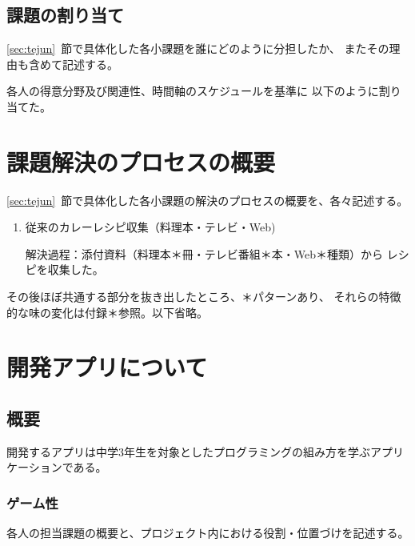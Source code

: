 \documentclass[openany,11pt,papersize]{jsbook}
\begin{document}

\section{課題の割り当て}
\begin{hissu}
\ref{sec:tejun}~節で具体化した各小課題を誰にどのように分担したか、
またその理由も含めて記述する。
\end{hissu}

各人の得意分野及び関連性、時間軸のスケジュールを基準に
以下のように割り当てた。


\chapter{課題解決のプロセスの概要}
\begin{hissu}
\ref{sec:tejun}~節で具体化した各小課題の解決のプロセスの概要を、各々記述する。
\end{hissu}

\begin{enumerate}
 \item 従来のカレーレシピ収集（料理本・テレビ・Web) 
\par 解決過程：添付資料（料理本＊冊・テレビ番組＊本・Web＊種類）から
     レシピを収集した。 
\end{enumerate}


その後ほぼ共通する部分を抜き出したところ、＊パターンあり、
それらの特徴的な味の変化は付録＊参照。以下省略。



\chapter{開発アプリについて}

\section{概要}
開発するアプリは中学3年生を対象としたプログラミングの組み方を学ぶアプリケーションである。

\subsection{ゲーム性}


\begin{hissu}
各人の担当課題の概要と、プロジェクト内における役割・位置づけを記述する。
\end{hissu}
\end{document}

